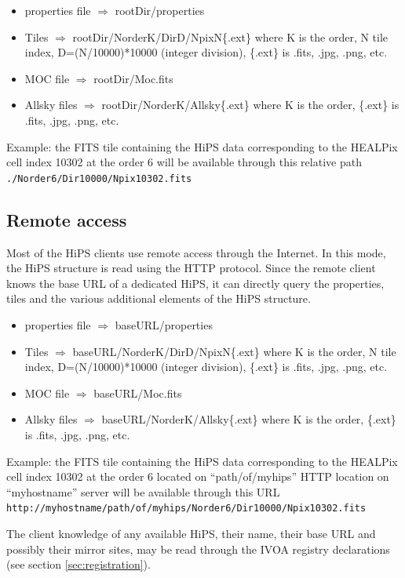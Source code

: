 \documentclass[11pt,a4paper]{ivoa}
\begin{document}
\begin{itemize}
\item properties file $\Rightarrow$ rootDir/properties
\item Tiles $\Rightarrow$ rootDir/NorderK/DirD/NpixN\{.ext\} where K is the order, N tile index, D=(N/10000)*10000 (integer division), \{.ext\} is .fits, .jpg, .png, etc.
\item MOC file $\Rightarrow$ rootDir/Moc.fits
\item Allsky files $\Rightarrow$ rootDir/NorderK/Allsky\{.ext\} where K is the order, \{.ext\} is .fits, .jpg, .png, etc.
\end{itemize}

Example: the FITS tile containing the HiPS data corresponding to the HEALPix cell index 10302 at the order 6 will be available through this relative path \texttt{./Norder6/Dir10000/Npix10302.fits}

\subsection{Remote access}

Most of the HiPS clients use remote access through the Internet. In this mode, the HiPS structure is read using the HTTP protocol. Since the remote client knows the base URL of a dedicated HiPS, it can directly query the properties, tiles and the various additional elements of the HiPS structure.

\begin{itemize}
\item properties file $\Rightarrow$ baseURL/properties
\item Tiles $\Rightarrow$ baseURL/NorderK/DirD/NpixN\{.ext\} where K is the order, N tile index, D=(N/10000)*10000 (integer division), \{.ext\} is .fits, .jpg, .png, etc.
\item MOC file $\Rightarrow$ baseURL/Moc.fits
\item Allsky files $\Rightarrow$ baseURL/NorderK/Allsky\{.ext\} where K is the order, \{.ext\} is .fits, .jpg, .png, etc.
\end{itemize}

Example: the FITS tile containing the HiPS data corresponding to the HEALPix cell index 10302 at the order 6 located on ``path/of/myhips'' HTTP location on ``myhostname'' server will be available through this URL \texttt{http://myhostname/path/of/myhips/Norder6/Dir10000/Npix10302.fits}

The client knowledge of any available HiPS, their name, their base URL and possibly their mirror sites, may be read through the IVOA registry declarations (see section \ref{sec:registration}). 
\end{document}
